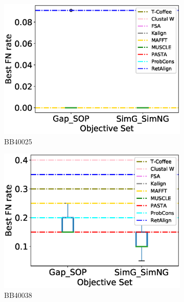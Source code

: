 \begin{figure}[!htbp]
\begin{adjustwidth}{-1.5cm}{-1cm}
\begin{subfigure}{0.22\textwidth}
			\includegraphics[width=\columnwidth]{Figure/summary/precomputedInit/Balibase/BB40025_objset_fnrate_rank}
			\caption{BB40025}
		\end{subfigure}
		\begin{subfigure}{0.22\textwidth}
			\includegraphics[width=\columnwidth]{Figure/summary/precomputedInit/Balibase/BB40038_objset_fnrate_rank}
			\caption{BB40038}
		\end{subfigure}
		\begin{subfigure}{0.22\textwidth}

\end{subfigure}
\end{adjustwidth}
\end{figure}
